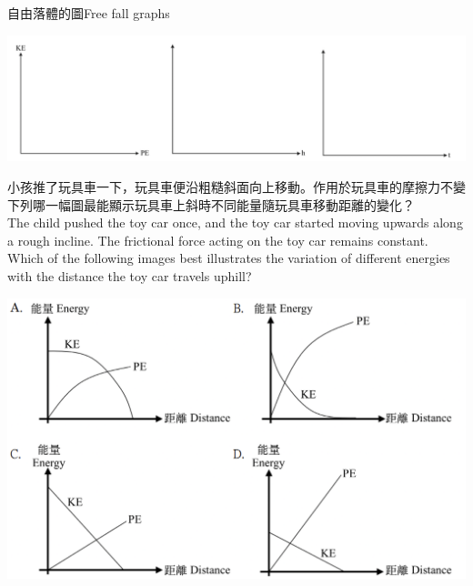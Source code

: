 \documentclass[beamer=true]{standalone}
\begin{document}
\begin{frame}{自由落體的圖Free fall graphs}
    \par{\par\centering
        \includegraphics[width=\textwidth]{assets/4aad36d4.png}
        \par}
\end{frame}


\begin{frame}{}
    小孩推了玩具車一下，玩具車便沿粗糙斜面向上移動。作用於玩具車的摩擦力不變 下列哪一幅圖最能顯示玩具車上斜時不同能量隨玩具車移動距離的變化？\\The child pushed the toy car once, and the toy car started moving upwards along a rough incline. The frictional force acting on the toy car remains constant. Which of the following images best illustrates the variation of different energies with the distance the toy car travels uphill?
    {\par\centering
    \includegraphics[width=.6\textwidth]{assets/6f1283a3.png}
    \par}
\end{frame}
\end{document}
